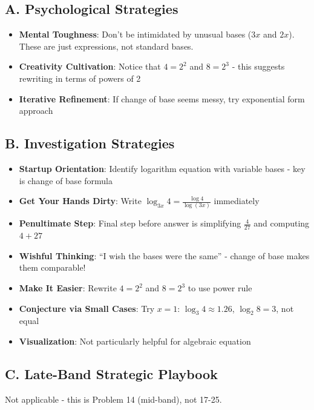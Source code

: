 \documentclass[12pt]{article}
\begin{document}
\begin{strategicbox}
\subsection*{A. Psychological Strategies}
\begin{itemize}[leftmargin=*]
    \item \textbf{Mental Toughness}: Don't be intimidated by unusual bases ($3x$ and $2x$). These are just expressions, not standard bases.
    \item \textbf{Creativity Cultivation}: Notice that $4 = 2^2$ and $8 = 2^3$ - this suggests rewriting in terms of powers of 2
    \item \textbf{Iterative Refinement}: If change of base seems messy, try exponential form approach
\end{itemize}

\subsection*{B. Investigation Strategies}
\begin{itemize}[leftmargin=*]
    \item \textbf{Startup Orientation}: Identify logarithm equation with variable bases - key is change of base formula
    \item \textbf{Get Your Hands Dirty}: Write $\log_{3x} 4 = \frac{\log 4}{\log(3x)}$ immediately
    \item \textbf{Penultimate Step}: Final step before answer is simplifying $\frac{4}{27}$ and computing $4+27$
    \item \textbf{Wishful Thinking}: ``I wish the bases were the same'' - change of base makes them comparable!
    \item \textbf{Make It Easier}: Rewrite $4 = 2^2$ and $8 = 2^3$ to use power rule
    \item \textbf{Conjecture via Small Cases}: Try $x=1$: $\log_3 4 \approx 1.26$, $\log_2 8 = 3$, not equal
    \item \textbf{Visualization}: Not particularly helpful for algebraic equation
\end{itemize}

\subsection*{C. Late-Band Strategic Playbook}
Not applicable - this is Problem 14 (mid-band), not 17-25.


\end{strategicbox}
\end{document}
